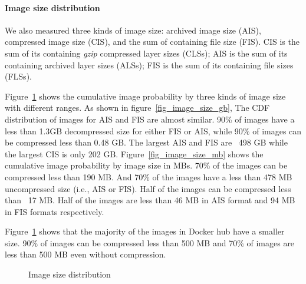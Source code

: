 \paragraph{Image size distribution}
\label{sec:image-size}
We also measured three kinds of image size: archived image size (AIS), compressed image size (CIS), and the sum of containing file size (FIS). CIS is the sum of its containing \textit{gzip} compressed layer sizes (CLSs); AIS is the sum of its containing archived layer sizes (ALSs); FIS is the sum of its containing file sizes (FLSs).

Figure~\ref{fig-image-size} shows the cumulative image probability by three kinds of image size with different ranges.
As shown in figure~\ref{fig_image_size_gb}, The CDF distribution of images for AIS and FIS are almost similar. 90\% of images have a less than 1.3GB decompressed size for either FIS or AIS, while 90\% of images can be compressed less than 0.48 GB. The largest AIS and FIS are ~498 GB while the largest CIS is only 202 GB.
Figure~\ref{fig_image_size_mb} shows the cumulative image probability by image size in MBs. 70\% of the images can be compressed less than 190 MB. And 70\% of the images have a less than 478 MB uncompressed size (i.e., AIS or FIS). Half of the images can be compressed less than ~17 MB. Half of the images are less than 46 MB in AIS format and 94 MB in FIS formats respectively.

Figure~\ref{fig-image-size} shows that the majority of the images in Docker hub have a smaller size. 90\% of images can be compressed less than 500 MB and 70\% of images are less than 500 MB even without compression. 

\begin{figure}[!t]
	\centering
	\caption{Image size distribution}
	\label{fig-image-size}
\end{figure}
